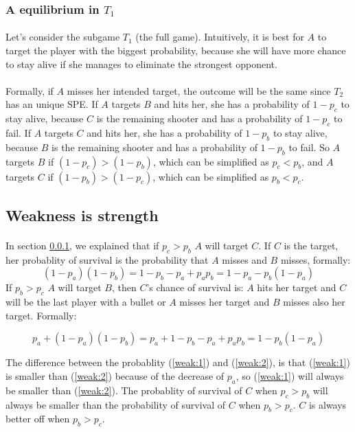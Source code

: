 \documentclass[letterpaper]{article}
\begin{document}
\subsubsection{A equilibrium in $T_1$}

\label{sec:spet1}

\paragraph{}


Let's consider the subgame $T_1$ (the full game). Intuitively, it is best for
$A$ to target the player with the biggest probability, because she will have
more chance to stay alive if she manages to eliminate the strongest opponent.

\paragraph{}

Formally, if $A$ misses her intended target, the outcome will be the same
since $T_2$ has an unique SPE. If $A$ targets $B$ and hits her, she has
a probability of $1 - p_c$ to stay alive, because $C$ is
the remaining shooter and has a probability of $1 - p_c$ to fail.
If $A$ targets $C$ and hits her,
she has a probability of $1 - p_b$ to stay alive, because $B$ is
the remaining shooter and has a probability of $1 - p_b$ to fail.
So $A$ targets $B$ if
$ (1 - p_c) > (1 - p_b)$, which can be simplified as
$p_c < p_b$, and $A$ targets $C$
if $(1 - p_b) > (1 - p_c)$, which can be simplified as $p_b < p_c$.


\subsection{Weakness is strength}

\paragraph{}

In section \ref{sec:spet1}, we explained that if $p_c > p_b$
$A$ will target $C$. If $C$ is the target, her probablity of survival
is the probability that $A$ misses and $B$ misses,
formally:
\begin{equation}
    \label{weak:1}
    (1 - p_a)(1 - p_b) = 1 - p_b - p_a + p_ap_b = 1 - p_a - p_b(1 - p_a)
\end{equation}
If $p_b > p_c$ $A$ will target $B$, then $C$'s chance of survival is:
$A$ hits
her target
and $C$ will be the last player with a bullet or $A$
misses her target and $B$ misses also her target. Formally:

\begin{equation}
    \label{weak:2}
    p_a + (1 - p_a)(1 - p_b) =
    p_a + 1 - p_b - p_a + p_ap_b = 1 - p_b(1 - p_a)
\end{equation}

The difference between the probablity (\ref{weak:1}) and (\ref{weak:2}),
is that
(\ref{weak:1}) is smaller than (\ref{weak:2})
because of the decrease of $p_a$, so (\ref{weak:1}) will
always be smaller than (\ref{weak:2}). The probablity of
survival of $C$ when $p_c > p_b$ will always be smaller than
the probability of survival of $C$ when $p_b > p_c$. $C$ is always better off
when $p_b > p_c$.
\end{document}
